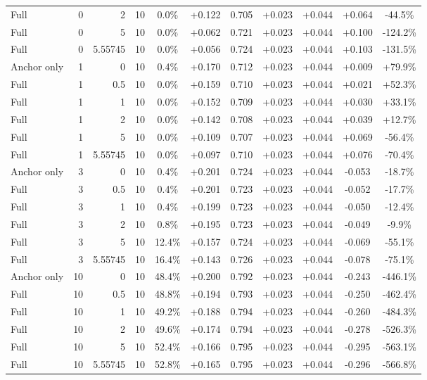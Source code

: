 \begin{table}[htbp]
\begin{tabular}{lrrrccccccc}
Full & 0 & 2 & 10 & 0.0\% & +0.122 & 0.705 & +0.023 & +0.044 & +0.064 & -44.5\% \\
Full & 0 & 5 & 10 & 0.0\% & +0.062 & 0.721 & +0.023 & +0.044 & +0.100 & -124.2\% \\
Full & 0 & 5.55745 & 10 & 0.0\% & +0.056 & 0.724 & +0.023 & +0.044 & +0.103 & -131.5\% \\
Anchor only & 1 & 0 & 10 & 0.4\% & +0.170 & 0.712 & +0.023 & +0.044 & +0.009 & +79.9\% \\
Full & 1 & 0.5 & 10 & 0.0\% & +0.159 & 0.710 & +0.023 & +0.044 & +0.021 & +52.3\% \\
Full & 1 & 1 & 10 & 0.0\% & +0.152 & 0.709 & +0.023 & +0.044 & +0.030 & +33.1\% \\
Full & 1 & 2 & 10 & 0.0\% & +0.142 & 0.708 & +0.023 & +0.044 & +0.039 & +12.7\% \\
Full & 1 & 5 & 10 & 0.0\% & +0.109 & 0.707 & +0.023 & +0.044 & +0.069 & -56.4\% \\
Full & 1 & 5.55745 & 10 & 0.0\% & +0.097 & 0.710 & +0.023 & +0.044 & +0.076 & -70.4\% \\
Anchor only & 3 & 0 & 10 & 0.4\% & +0.201 & 0.724 & +0.023 & +0.044 & -0.053 & -18.7\% \\
Full & 3 & 0.5 & 10 & 0.4\% & +0.201 & 0.723 & +0.023 & +0.044 & -0.052 & -17.7\% \\
Full & 3 & 1 & 10 & 0.4\% & +0.199 & 0.723 & +0.023 & +0.044 & -0.050 & -12.4\% \\
Full & 3 & 2 & 10 & 0.8\% & +0.195 & 0.723 & +0.023 & +0.044 & -0.049 & -9.9\% \\
Full & 3 & 5 & 10 & 12.4\% & +0.157 & 0.724 & +0.023 & +0.044 & -0.069 & -55.1\% \\
Full & 3 & 5.55745 & 10 & 16.4\% & +0.143 & 0.726 & +0.023 & +0.044 & -0.078 & -75.1\% \\
Anchor only & 10 & 0 & 10 & 48.4\% & +0.200 & 0.792 & +0.023 & +0.044 & -0.243 & -446.1\% \\
Full & 10 & 0.5 & 10 & 48.8\% & +0.194 & 0.793 & +0.023 & +0.044 & -0.250 & -462.4\% \\
Full & 10 & 1 & 10 & 49.2\% & +0.188 & 0.794 & +0.023 & +0.044 & -0.260 & -484.3\% \\
Full & 10 & 2 & 10 & 49.6\% & +0.174 & 0.794 & +0.023 & +0.044 & -0.278 & -526.3\% \\
Full & 10 & 5 & 10 & 52.4\% & +0.166 & 0.795 & +0.023 & +0.044 & -0.295 & -563.1\% \\
Full & 10 & 5.55745 & 10 & 52.8\% & +0.165 & 0.795 & +0.023 & +0.044 & -0.296 & -566.8\% \\

\end{tabular}
\end{table}
